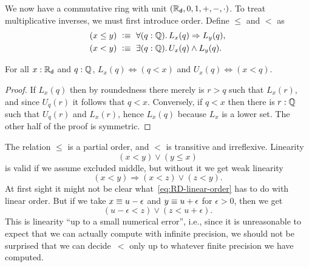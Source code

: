 We now have a commutative ring with unit
%
$(\mathbb{R}_\mathsf{d}, 0, 1, {+}, {-}, {\cdot})$. To treat
multiplicative inverses, we must first introduce order. Define $\leq$ and $<$ as
%
\begin{align*}
  (x \leq y) &\ \defeq \ \fall{q : \Q} L_x(q) \Rightarrow L_y(q), \\
  (x < y)    &\ \defeq \ \exis{q : \Q} U_x(q) \land L_y(q).
\end{align*}

\begin{lem} \label{dedekind-in-cut-as-le}
  For all $x : \mathbb{R}_\mathsf{d}$ and $q : \mathbb{Q}$, $L_x(q) \Leftrightarrow (q < x)$ and $U_x(q)
  \Leftrightarrow (x < q)$.
\end{lem}

\begin{proof}
  If $L_x(q)$ then by roundedness there merely is $r > q$ such that $L_x(r)$, and since
  $U_q(r)$ it follows that $q < x$. Conversely, if $q < x$ then there is $r : \mathbb{Q}$ such
  that $U_q(r)$ and $L_x(r)$, hence $L_x(q)$ because $L_x$ is a lower set. The other half
  of the proof is symmetric.
\end{proof}

%
The relation $\leq$ is a partial order, and $<$ is transitive and irreflexive. Linearity
%
%
%
\begin{equation*}
  (x < y) \lor (y \leq x)
\end{equation*}
%
is valid if we assume excluded middle, but without it we get weak linearity
%
\begin{equation} \label{eq:RD-linear-order}
  (x < y) \Rightarrow (x < z) \lor (z < y).
\end{equation}
%
At first sight it might not be clear what~\eqref{eq:RD-linear-order} has to do with
linear order. But if we take $x \equiv u - \epsilon$ and $y \equiv u + \epsilon$ for
$\epsilon > 0$, then we get
%
\begin{equation*}
  (u - \epsilon < z) \lor (z < u + \epsilon).
\end{equation*}
%
This is linearity ``up to a small numerical error'', i.e., since it is unreasonable to
expect that we can actually compute with infinite precision, we should not be surprised
that we can decide~$<$ only up to whatever finite precision we have computed.

